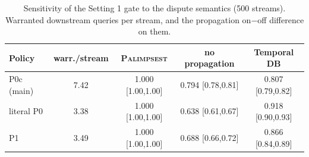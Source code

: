 \begin{table}[t]\centering\small
\caption{Sensitivity of the Setting 1 gate to the dispute semantics (500 streams). Warranted downstream queries per stream, and the propagation on$-$off difference on them.}\label{tab:sens}
\begin{tabular}{lcccc}
\toprule
Policy & warr./stream & \textsc{Palimpsest} & no propagation & Temporal DB \\
\midrule
P0c (main) & 7.42 & 1.000 {\tiny[1.00,1.00]} & 0.794 {\tiny[0.78,0.81]} & 0.807 {\tiny[0.79,0.82]} \\
literal P0 & 3.38 & 1.000 {\tiny[1.00,1.00]} & 0.638 {\tiny[0.61,0.67]} & 0.918 {\tiny[0.90,0.93]} \\
P1 & 3.49 & 1.000 {\tiny[1.00,1.00]} & 0.688 {\tiny[0.66,0.72]} & 0.866 {\tiny[0.84,0.89]} \\
\bottomrule
\end{tabular}
\end{table}
